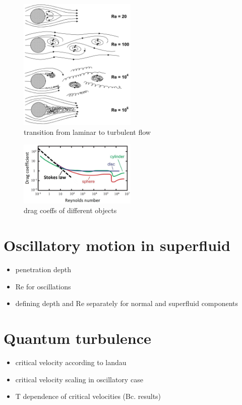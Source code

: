 \begin{figure}[h]
	\centering
	\includegraphics[width=0.5\textwidth]{graphics/theory/laminar-turbulent}
	\caption{transition from laminar to turbulent flow}
	\label{laminar-turbulent}
\end{figure}

\begin{figure}[h]
	\centering
	\includegraphics[width=0.5\textwidth]{graphics/theory/C-Re}
	\caption{drag coeffs of different objects}
	\label{C-Re}
\end{figure}


\section{Oscillatory motion in superfluid}
\begin{itemize}
	\item penetration depth
	\item Re for oscillations
	\item defining depth and Re separately for normal and superfluid components
\end{itemize}

\section{Quantum turbulence}
\begin{itemize}
	\item critical velocity according to landau
	\item critical velocity scaling in oscillatory case
	\item T dependence of critical velocities (Bc. results)
\end{itemize}

